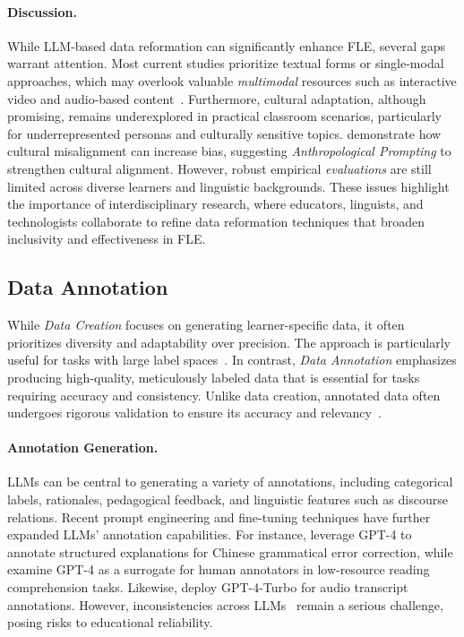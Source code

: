 \paragraph{Discussion.} While LLM-based data reformation can significantly enhance FLE, several gaps warrant attention. Most current studies prioritize textual forms or single-modal approaches, which may overlook valuable \textit{multimodal} resources such as interactive video and audio-based content~\cite{ghosal2023text}. Furthermore, cultural adaptation, although promising, remains underexplored in practical classroom scenarios, particularly for underrepresented personas and culturally sensitive topics. \citet{alkhamissi-etal-2024-investigating} demonstrate how cultural misalignment can increase bias, suggesting \textit{Anthropological Prompting} to strengthen cultural alignment. However, robust empirical \textit{evaluations} are still limited across diverse learners and linguistic backgrounds. These issues highlight the importance of interdisciplinary research, where educators, linguists, and technologists collaborate to refine data reformation techniques that broaden inclusivity and effectiveness in FLE.

\subsection{Data Annotation}
While \textit{Data Creation} focuses on generating learner-specific data, it often prioritizes diversity and adaptability over precision. The approach is particularly useful for tasks with large label spaces~\cite{ding-etal-2024-data}. In contrast, \textit{Data Annotation} emphasizes producing high-quality, meticulously labeled data that is essential for tasks requiring accuracy and consistency. Unlike data creation, annotated data often undergoes rigorous validation to ensure its accuracy and relevancy~\cite{artemova2024hands}.

\paragraph{Annotation Generation.} LLMs can be central to generating a variety of annotations, including categorical labels, rationales, pedagogical feedback, and linguistic features such as discourse relations. Recent prompt engineering and fine-tuning techniques have further expanded LLMs’ annotation capabilities. For instance, \citet{ye2024excgec} leverage GPT-4 to annotate structured explanations for Chinese grammatical error correction, while \citet{samuel-etal-2024-llms} examine GPT-4 as a surrogate for human annotators in low-resource reading comprehension tasks. Likewise, \citet{li-etal-2024-eden} deploy GPT-4-Turbo for audio transcript annotations. However, inconsistencies across LLMs~\cite{tornberg2024best} remain a serious challenge, posing risks to educational reliability.

